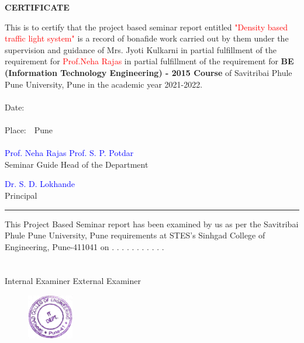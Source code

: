 \documentclass[12pt,a4paper]{report}
\begin{document}
\begin{center}
	
	\textbf{\Large{CERTIFICATE}}
\end{center}
This is to certify that the project based seminar report entitled \textcolor{red}{"Density based traffic light system"} is
a record of bonafide work carried out by them under the supervision and guidance of Mrs. Jyoti Kulkarni in partial fulfillment of the requirement for \textcolor{red}{Prof.Neha Rajas} in partial fulfillment of the requirement for \textbf{BE (Information Technology Engineering) - 2015  Course} of Savitribai Phule Pune University, Pune in the academic year 2021-2022.\\
\\
Date:\ \ 
\\
\\Place:\ \ Pune
\\
\\\textcolor{blue}{Prof. Neha Rajas} \hspace{180pt} \textcolor{blue}{Prof. S. P. Potdar}
\\\hspace{20pt} Seminar Guide \hspace{180pt} Head of the Department
\\

 \begin{center}
 	\textcolor{blue}{Dr. S. D. Lokhande}\\
{Principal}
\end{center}

\noindent\rule{\textwidth}{0.4pt}
\par This Project Based Seminar report has been examined by us as per the Savitribai Phule Pune University, Pune requirements at STES's Sinhgad College of Engineering, Pune-411041 on . . . . . . . . . . .
\\
\\ \\Internal Examiner \hspace{180pt} External Examiner 
\begin{figure}[h]
	\centering
	\includegraphics[width=2cm,height=2cm]{ITStamp.png}
\end{figure}


\end{document}
